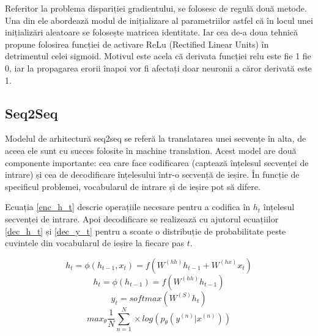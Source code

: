 Referitor la problema dispariției gradientului, se folosesc de regulă două metode. Una din ele abordează modul de inițializare al parametriilor astfel că în locul unei inițializări aleatoare se folosește matricea identitate. Iar cea de-a doua tehnică propune folosirea funcției de activare ReLu (Rectified Linear Units) în detrimentul celei sigmoid. Motivul este acela că derivata funcției relu este fie 1 fie 0, iar la propagarea erorii înapoi vor fi afectați doar neuronii a căror derivată este 1.

\subsection{Seq2Seq}

Modelul de arhitectură seq2seq se referă la translatarea unei secvențe în alta, de aceea ele sunt cu succes folosite în machine translation.
Acest model are două componente importante: cea care face codificarea (captează înțelesul secvenței de intrare) și cea de decodificare înțelesului într-o secvență de ieșire. În funcție de specificul problemei, vocabularul de intrare și de ieșire pot să difere.

Ecuația \ref{enc_h_t} descrie operațiile necesare pentru a codifica în $h_t$ înțelesul secvenței de intrare. Apoi decodificare se realizează cu ajutorul ecuațiilor \ref{dec_h_t} și \ref{dec_y_t} pentru a scoate o distribuție de probabilitate peste cuvintele din vocabularul de ieșire la fiecare pas $t$.


\begin{equation}
h_t = \phi(h_{t-1}, x_t) = f(W^{(hh)} h_{t-1} + W^{(hx)} x_t)
\label{enc_h_t}
\end{equation}
\begin{equation}
h_t = \phi(h_{t-1}) = f(W^{(hh)} h_{t-1})
\label{dec_h_t}
\end{equation}
\begin{equation}
y_t = softmax(W^{(S)} h_t) 
\label{dec_y_t}
\end{equation}
\begin{equation}
max_{\theta}\frac{1}{N} \sum_{n=1}^{N}\times log(p_\theta(y^{(n)}|x^{(n)}))
\label{seq2seq_loss}
\end{equation}

